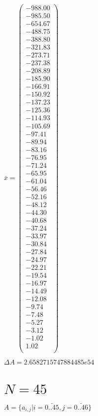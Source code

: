 \documentclass[a4paper,12pt]{article}
\begin{document}
$\bar { x } = \begin{pmatrix}
-988.00 \\
-985.50 \\
-654.67 \\
-488.75 \\
-388.80 \\
-321.83 \\
-273.71 \\
-237.38 \\
-208.89 \\
-185.90 \\
-166.91 \\
-150.92 \\
-137.23 \\
-125.36 \\
-114.93 \\
-105.69 \\
-97.41 \\
-89.94 \\
-83.16 \\
-76.95 \\
-71.24 \\
-65.95 \\
-61.04 \\
-56.46 \\
-52.16 \\
-48.12 \\
-44.30 \\
-40.68 \\
-37.24 \\
-33.97 \\
-30.84 \\
-27.84 \\
-24.97 \\
-22.21 \\
-19.54 \\
-16.97 \\
-14.49 \\
-12.08 \\
-9.74 \\
-7.48 \\
-5.27 \\
-3.12 \\
-1.02 \\
1.02 \\
\end{pmatrix}
$

$\Delta A = 2.6582715747884485e54$



\section{ $N = 45$ }
$A = \{ a _{ i, j } | i = \bar { 0..45 }, j = \bar { 0..46 } \}$
\end{document}
